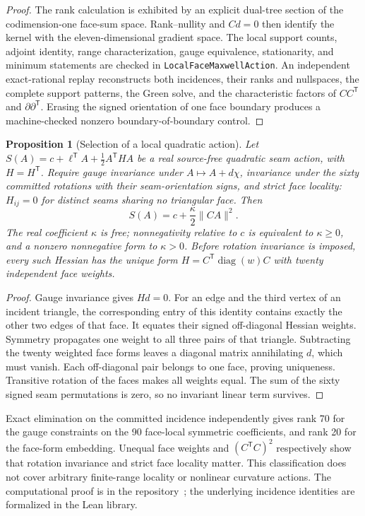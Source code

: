 \documentclass[11pt]{article}
\newtheorem{proposition}[theorem]{Proposition}
\theoremstyle{remark}
\theoremstyle{plain}
\begin{document}
\begin{proof}
The rank calculation is exhibited by an explicit dual-tree section of the
codimension-one face-sum space. Rank--nullity and \(Cd=0\) then identify the
kernel with the eleven-dimensional gradient space. The local support counts,
adjoint identity, range characterization, gauge equivalence, stationarity,
and minimum statements are checked in
\texttt{LocalFaceMaxwellAction}. An independent exact-rational replay
reconstructs both incidences, their ranks and nullspaces, the complete support
patterns, the Green solve, and the characteristic factors of \(CC^{\mathsf T}\)
and \(\partial\partial^{\mathsf T}\). Erasing the signed orientation of one
face boundary produces a machine-checked nonzero boundary-of-boundary
control.
\end{proof}

\begin{proposition}[Selection of a local quadratic action]
\label{prop:local-maxwell-selection}
Let $S(A)=c+\ell^{\mathsf T}A+\tfrac12A^{\mathsf T}HA$ be a real
source-free quadratic seam action, with $H=H^{\mathsf T}$. Require gauge
invariance under $A\mapsto A+d\chi$, invariance under the sixty committed
rotations with their seam-orientation signs, and strict face locality:
$H_{ij}=0$ for distinct seams sharing no triangular face. Then
\[
 S(A)=c+\frac\kappa2\|CA\|^2.
\]
The real coefficient $\kappa$ is free; nonnegativity relative to $c$ is
equivalent to $\kappa\geq0$, and a nonzero nonnegative form to $\kappa>0$.
Before rotation invariance is imposed, every such Hessian has the unique form
$H=C^{\mathsf T}\operatorname{diag}(w)C$ with twenty independent face weights.
\end{proposition}
\begin{proof}
Gauge invariance gives $Hd=0$. For an edge and the third vertex of an
incident triangle, the corresponding entry of this identity contains
exactly the other two edges of that face. It equates their signed
off-diagonal Hessian weights. Symmetry propagates one weight to all three
pairs of that triangle. Subtracting the twenty weighted face forms leaves
a diagonal matrix annihilating $d$, which must vanish. Each off-diagonal
pair belongs to one face, proving uniqueness. Transitive rotation of the
faces makes all weights equal. The sum of the sixty signed seam
permutations is zero, so no invariant linear term survives.
\end{proof}

Exact elimination on the committed incidence independently gives rank 70
for the gauge constraints on the 90 face-local symmetric coefficients,
and rank 20 for the face-form embedding. Unequal face weights and
$(C^{\mathsf T}C)^2$ respectively show that rotation invariance and strict
face locality matter. This classification does not cover arbitrary
finite-range locality or nonlinear curvature actions. The computational proof
is in the repository~\cite{ophrepo}; the underlying incidence
identities are formalized in the Lean library.
\end{document}
